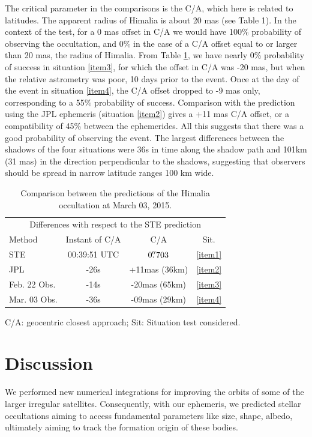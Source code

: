 \documentclass[useAMS,usenatbib]{mn2e}
\begin{document}
The critical parameter in the comparisons is the C/A, which here is related to latitudes. The apparent radius of Himalia is about 20 mas (see Table 1). In the context of the test, for a 0 mas offset in C/A we would have 100\% probability of observing the occultation, and 0\% in the case of a C/A offset equal to or larger than 20 mas, the radius of Himalia. From Table \ref{Tab: comparison-Himalia}, we have nearly 0\% probability of success in situation \ref{item3}, for which the offset in C/A was -20 mas, but when the relative astrometry was poor, 10 days prior to the event. Once at the day of the event in situation \ref{item4}, the C/A offset dropped to -9 mas only, corresponding to a 55\% probability of success. Comparison with the prediction using the JPL ephemeris (situation \ref{item2}) gives a +11 mas C/A offset, or a compatibility of 45\% between the ephemerides. All this suggests that there was a good probability of observing the event. The largest differences between the shadows of the four situations were 36s in time along the shadow path and 101km (31 mas) in the direction perpendicular to the shadows, suggesting that observers should be spread in narrow latitude ranges 100 km wide.

\begin{table}
\caption{\label{Tab: comparison-Himalia} Comparison between the predictions of the Himalia occultation at March 03, 2015.}
\begin{centering}
\begin{tabular}{lccc}
\hline  \hline
\multicolumn{4}{c}{Differences with respect to the STE prediction} \tabularnewline
Method  & Instant of C/A  & C/A & Sit.   \tabularnewline
\hline
STE & 00:39:51 UTC & $0\hbox{$.\!\!^{\prime\prime}$}703$ & \ref{item1} \tabularnewline
JPL & -26s & +11mas (36km) & \ref{item2} \tabularnewline %
Feb. 22 Obs. & -14s & -20mas (65km) & \ref{item3} \tabularnewline %
Mar. 03 Obs. & -36s & -09mas (29km) & \ref{item4} \tabularnewline %
\hline
\end{tabular}
\par\end{centering}
C/A: geocentric closest approach; Sit: Situation test considered.
\end{table}

\section{Discussion} \label{Sec: discussion}

We performed new numerical integrations for improving the orbits of some of the larger irregular satellites. Consequently, with our ephemeris, we predicted stellar occultations aiming to access fundamental parameters like size, shape, albedo, ultimately aiming to track the formation origin of these bodies.
\end{document}
